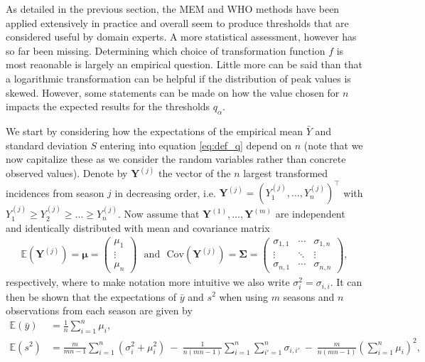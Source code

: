 \documentclass{article}
\newcommand{\sd}{s}
\newcommand{\mean}{\bar{y}}
\begin{document}
As detailed in the previous section, the MEM and WHO methods have been applied extensively in practice and overall seem to produce thresholds that are considered useful by domain experts. A more statistical assessment, however has so far been missing. Determining which choice of transformation function $f$ is most reaonable is largely an empirical question. Little more can be said than that a logarithmic transformation can be helpful if the distribution of peak values is skewed. However, some statements can be made on how the value chosen for $n$ impacts the expected results for the thresholds $q_\alpha$.

We start by considering how the expectations of the empirical mean $\bar{Y}$ and standard deviation $S$ entering into equation \eqref{eq:def_q} depend on $n$ (note that we now capitalize these as we consider the random variables rather than concrete observed values). Denote by $\mathbf{Y}^{(j)}$ the vector of the $n$ largest transformed incidences from season $j$ in decreasing order, i.e. $\mathbf{Y}^{(j)} = (Y^{(j)}_1, \dots, Y^{(j)}_n)^\top$ with $Y^{(j)}_1 \geq Y^{(j)}_2 \geq \dots \geq Y^{(j)}_n$. Now assume that $\mathbf{Y}^{(1)}, \dots, \mathbf{Y}^{(m)}$ are independent and identically distributed with mean and covariance matrix
\begin{align}
\mathbb{E}\left(\mathbf{Y}^{(j)}\right) = \boldsymbol{\mu} = \left(\begin{array}{c}
\mu_1\\
\vdots\\
\mu_n
\end{array}\right) \ \ \ \text{and} \ \ \ \text{Cov}\left(\mathbf{Y}^{(j)}\right) = \boldsymbol{\Sigma} =
\left(\begin{array}{ccc}
\sigma_{1, 1} & \cdots & \sigma_{1, n}\\
\vdots & \ddots &\vdots\\
\sigma_{n, 1} & \cdots & \sigma_{n, n}
\end{array}\right),
\end{align}
respectively, where to make notation more intuitive we also write $\sigma^2_i = \sigma_{i, i}$. It can then be shown that the expectations of $\mean$ and $\sd^2$ when using $m$ seasons and $n$ observations from each season are given by
\begin{align}
\mathbb{E}(\mean) & = \frac{1}{n} \sum_{i = 1}^n \mu_i,
\label{eq:expectation_mu}\\
\mathbb{E}(\sd^2) & = \frac{m}{mn - 1} \sum_{i = 1}^n (\sigma_{i}^2 + \mu_i^2) \ - \ \frac{1}{n(mn - 1)} \sum_{i = 1}^n \sum_{i' = 1}^n \sigma_{i,i'} \ - \ \frac{m}{n(mn - 1)}\left(\sum_{i = 1}^n \mu_i\right)^2,
\label{eq:expectation_sigma2}
\end{align}
\end{document}
